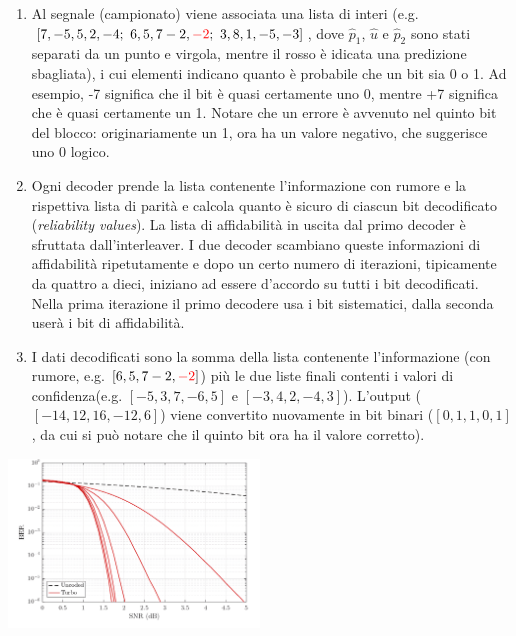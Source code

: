 \begin{enumerate}
    \item Al segnale (campionato) viene associata una lista di interi (e.g. $[7, -5, 5, 2, -4; \ 6, 5, 7 -2, \textcolor{red}{-2}; \ 3, 8, 1, -5, -3]$, dove $\hat{p}_1$, $\hat{u}$ e $\hat{p}_2$ sono stati separati da un punto e virgola, mentre il rosso è idicata una predizione sbagliata), 
    i cui elementi indicano quanto è probabile che un bit sia 0 o 1. Ad esempio, -7 significa che il bit è quasi certamente uno 0, mentre +7 significa che è quasi certamente un 1. Notare che un errore è avvenuto nel quinto bit del blocco: originariamente un 1, ora ha un valore negativo, che suggerisce uno 0 logico.
    \item Ogni decoder prende la lista contenente l'informazione con rumore e la rispettiva lista di parità e calcola quanto è sicuro di ciascun bit decodificato (\textit{reliability values}). La lista di affidabilità in uscita dal primo decoder è sfruttata dall'interleaver. I due decoder scambiano queste informazioni di affidabilità ripetutamente e dopo un certo numero di iterazioni, tipicamente da quattro a dieci, iniziano ad essere d'accordo su tutti i bit decodificati. Nella prima iterazione il primo decodere usa i bit sistematici, dalla seconda userà i bit di affidabilità.
    \item I dati decodificati sono la somma della lista contenente l'informazione (con rumore, e.g. $[6, 5, 7 -2, \textcolor{red}{-2}]$) più le due liste finali contenti i valori di confidenza(e.g. $[-5, 3, 7, -6, 5]$ e $[-3, 4, 2, -4, 3]$). L'output ($[-14, 12, 16, -12, 6]$) viene convertito nuovamente in bit binari ($[0, 1, 1, 0, 1]$,  da cui si può notare che il quinto bit ora ha il valore corretto).
\end{enumerate}



\begin{center}
    
\includegraphics[width=0.5\textwidth]{imgs/turbo_code_ber.png}
\end{center}

